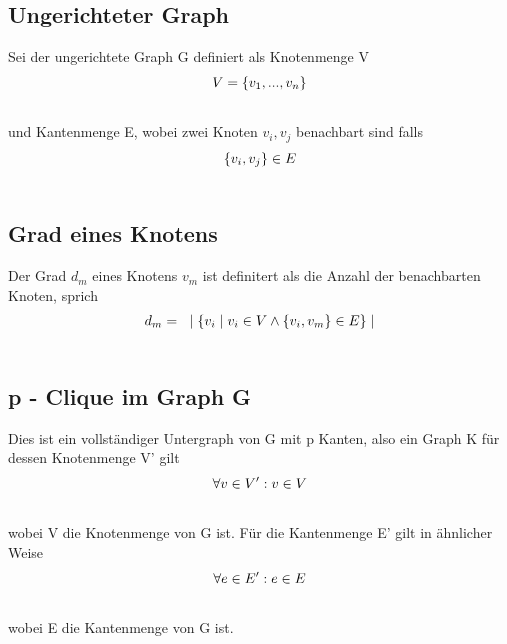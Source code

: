 \documentclass[12pt, a4paper]{article}
\begin{document}
\subsection{Ungerichteter Graph}
\label{theorem:ungerichteter-graph}
Sei der ungerichtete Graph G definiert als Knotenmenge V
\begin{gather}
\begin{split}V = \{ v_1, ..., v_n \}\end{split}\notag\\\begin{split}\end{split}\notag
\end{gather}
und Kantenmenge E, wobei zwei Knoten $v_i, v_j$ benachbart sind falls
\begin{gather}
\begin{split}\{v_i, v_j\} \in E\end{split}\notag\\\begin{split}\end{split}\notag
\end{gather}

\subsection{Grad eines Knotens}
\label{theorem:grad-eines-knotens}
Der Grad $d_m$ eines Knotens $v_m$ ist definitert als die Anzahl der benachbarten Knoten, sprich
\begin{gather}
\begin{split}d_m = \text{  } \mid \{ v_i \mid v_i \in V \wedge \{ v_i, v_m \} \in E \} \mid\end{split}\notag\\\begin{split}\end{split}\notag
\end{gather}

\subsection{p - Clique im Graph G}
\label{theorem:p-clique-im-graph-g}
Dies ist ein vollständiger Untergraph von G mit p Kanten, also ein Graph K für dessen Knotenmenge V' gilt
\begin{gather}
\begin{split}\forall v \in V': v \in V\end{split}\notag\\\begin{split}\end{split}\notag
\end{gather}
wobei V die Knotenmenge von G ist. Für die Kantenmenge E' gilt in ähnlicher Weise
\begin{gather}
\begin{split}\forall e \in E': e \in E\end{split}\notag\\\begin{split}\end{split}\notag
\end{gather}
wobei E die Kantenmenge von G ist.
\end{document}
